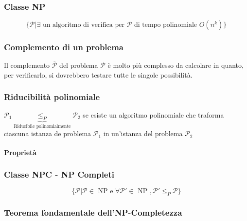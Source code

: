 
\subsubsection{Classe NP}

\begin{equation}
\{\mathcal{P} | \exists \text{ un algoritmo di verifica per } \mathcal{P} \text{ di tempo polinomiale } O(n^k) \}
\end{equation}


\subsubsection{Complemento di un problema}

Il complemento $\mathcal{\overline{P}}$ del problema $\mathcal{P}$ è molto più complesso da calcolare in quanto, per verificarlo, si dovrebbero testare tutte le singole possibilità.


\subsubsection{Riducibilità polinomiale}

$\mathcal{P}_1 \underbrace{\leq_P}_\text{Riducibile polinomialmente} \mathcal{P}_2$ se esiste un algoritmo polinomiale che traforma ciascuna istanza de problema $\mathcal{P}_1$ in un'istanza del problema $\mathcal{P}_2$

\paragraph{Proprietà}


\subsubsection{Classe NPC - NP Completi}

\begin{equation}
\{\mathcal{P} | \mathcal{P} \in \text{ NP e } \forall \mathcal{P}' \in \text{ NP }, \mathcal{P}' \leq_P \mathcal{P} \}
\end{equation}


\subsubsection{Teorema fondamentale dell'NP-Completezza}

